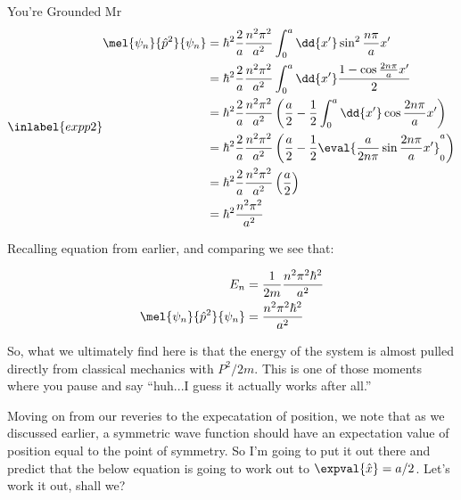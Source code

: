 \begin{answer}
\begin{answerpart}{You're Grounded Mr}
    \begin{equation}
      \inlabel{expp2}
      \begin{split}
        \mel{\psi_n}{\hat{p}^2}{\psi_n}
        &=
        \hbar^2
        \frac{2}{a}
        \frac{n^2\pi^2}{a^2}
        \int_0^a \dd{x'}
        \sin^2{\frac{n\pi}{a}x'}
        \\
        &=
        \hbar^2
        \frac{2}{a}
        \frac{n^2\pi^2}{a^2}
        \int_0^a \dd{x'}
        \frac{1 - \cos{\frac{2n\pi}{a}x'}}{2}
        \\
        &=
        \hbar^2
        \frac{2}{a}
        \frac{n^2\pi^2}{a^2}
        \left(
        \frac{a}{2}
        -
        \frac{1}{2}
        \int_0^a \dd{x'}
        \cos{\frac{2n\pi}{a}x'}
        \right)
        \\
        &=
        \hbar^2
        \frac{2}{a}
        \frac{n^2\pi^2}{a^2}
        \left(
        \frac{a}{2}
        -
        \frac{1}{2}
        \eval{
          \frac{a}{2n\pi}\sin{\frac{2n\pi}{a}x'}
        }_0^a
        \right)
        \\
        &=
        \hbar^2
        \frac{2}{a}
        \frac{n^2\pi^2}{a^2}
        \left(
        \frac{a}{2}
        \right)
        \\
        &=
        \hbar^2
        \frac{n^2\pi^2}{a^2}
        \\
      \end{split}
    \end{equation}

    Recalling equation  from earlier, and comparing
    we see that:

    \begin{equation}
      \begin{split}
        E_n
        &= \frac{1}{2m}\frac{n^2\pi^2\hbar^2}{a^2}
        \\
        \mel{\psi_n}{\hat{p}^2}{\psi_n}
        &= \frac{n^2\pi^2\hbar^2}{a^2}
        \\
      \end{split}
    \end{equation}
    
    So, what we ultimately find here is that the energy of the system
    is almost pulled directly from classical mechanics with $P^2/2m$.
    This is one of those moments where you pause and say ``huh...I
    guess it actually works after all.''

    Moving on from our reveries to the expecatation of position, we
    note that as we discussed earlier, a symmetric wave function
    should have an expectation value of position equal to the point of
    symmetry.  So I'm going to put it out there and predict that the
    below equation is going to work out to $\expval{\hat{x}} = a/2$.
    Let's work it out, shall we?


\end{answerpart}
\end{answer}
